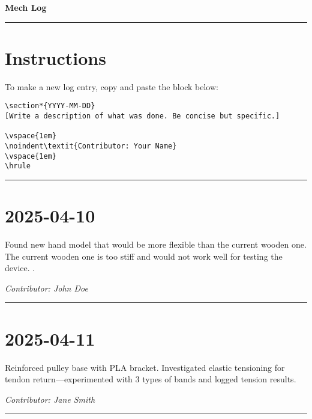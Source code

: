 \documentclass[12pt]{article}
\begin{document}
\begin{center}
    {\Huge\bfseries Mech Log}
\end{center}
\vspace{1em}
\hrule
\vspace{1em}

\section*{Instructions}
To make a new log entry, copy and paste the block below:

\begin{verbatim}
\section*{YYYY-MM-DD}
[Write a description of what was done. Be concise but specific.]

\vspace{1em}
\noindent\textit{Contributor: Your Name}
\vspace{1em}
\hrule
\end{verbatim}

\vspace{1em}
\hrule
\vspace{1em}


\section*{2025-04-10}
Found new hand model that would be more flexible than the current wooden one. The current wooden one is too stiff and would not work well for testing the device. .

\vspace{1em}
\noindent\textit{Contributor: John Doe}
\vspace{1em}
\hrule

\section*{2025-04-11}
Reinforced pulley base with PLA bracket. Investigated elastic tensioning for tendon return—experimented with 3 types of bands and logged tension results.

\vspace{1em}
\noindent\textit{Contributor: Jane Smith}
\vspace{1em}
\hrule

\end{document}
